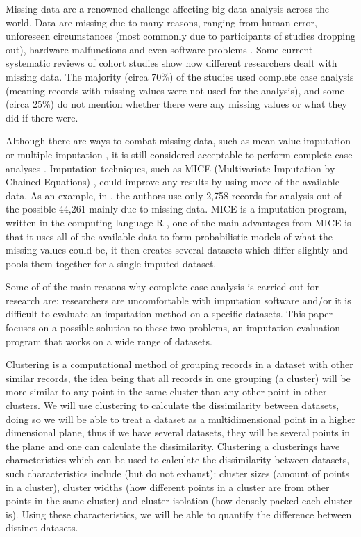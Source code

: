 \documentclass[conference,compsoc]{IEEEtran}
\begin{document}
	Missing data are a renowned challenge affecting big data analysis across the world. Data are missing due to many reasons, ranging from human error, unforeseen circumstances (most commonly due to participants of studies dropping out), hardware malfunctions and even software problems \cite{pigott2001review}. Some current systematic reviews of cohort studies \cite{systematic1,systematic2,systematic3} show how different researchers dealt with missing data. The majority (circa 70\%) of the studies used complete case analysis (meaning records with missing values were not used for the analysis), and some (circa 25\%) do not mention whether there were any missing values or what they did if there were. 

	Although there are ways to combat missing data, such as mean-value imputation or multiple imputation \cite{missing1,missing2,missing3}, it is still considered acceptable to perform complete case analyses \cite{systematic1,systematic2,systematic3}. Imputation techniques, such as MICE (Multivariate Imputation by Chained Equations) \cite{MICE}, could improve any results by using more of the available data. As an example, in \cite{epi1}, the authors use only 2,758 records for analysis out of the possible 44,261 mainly due to missing data. MICE is a imputation program, written in the computing language R \cite{r}, one of the main advantages from MICE is that it uses all of the available data to form probabilistic models of what the missing values could be, it then creates several datasets which differ slightly and pools them together for a single imputed dataset.

	Some of of the main reasons why complete case analysis is carried out for research are: researchers are uncomfortable with imputation software and/or it is difficult to evaluate an imputation method on a specific datasets. This paper focuses on a possible solution to these two problems, an imputation evaluation program that works on a wide range of datasets.

	Clustering \cite{clustering,clust-char}is a computational method of grouping records in a dataset with other similar records, the idea being that all records in one grouping (a cluster) will be more similar to any point in the same cluster than any other point in other clusters. We will use clustering to calculate the dissimilarity between datasets, doing so we will be able to treat a dataset as a multidimensional point in a higher dimensional plane, thus if we have several datasets, they will be several points in the plane and one can calculate the dissimilarity. Clustering a clusterings have characteristics which can be used to calculate the dissimilarity between datasets, such characteristics include (but do not exhaust): cluster sizes (amount of points in a cluster), cluster widths (how different points in a cluster are from other points in the same cluster) and cluster isolation (how densely packed each cluster is). Using these characteristics, we will be able to quantify the difference between distinct datasets. 
\end{document}
